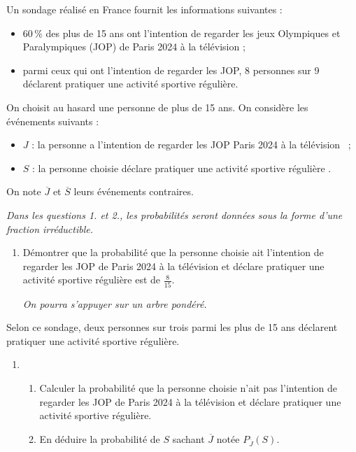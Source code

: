 Un sondage réalisé en France fournit les informations suivantes :

\begin{itemize}
	\item 60\,\% des plus de 15 ans ont l'intention de regarder les jeux Olympiques et Paralympiques (JOP) de Paris 2024 à la télévision ;
	\item parmi ceux qui ont l'intention de regarder les JOP, 8 personnes sur 9 déclarent pratiquer une activité sportive régulière.
\end{itemize}

On choisit au hasard une personne de plus de 15 ans. On considère les événements suivants :

\begin{itemize}
	\item $J$ : \og la personne a l'intention de regarder les JOP Paris 2024 à la télévision \fg\ ;
	\item $S$ : \og la personne choisie déclare pratiquer une activité sportive régulière \fg.
\end{itemize}

On note $\overline{J}$ et $\overline{S}$ leurs événements contraires.

\smallskip

\textit{Dans les questions 1. et 2., les probabilités seront données sous la forme d'une fraction irréductible.}

\begin{enumerate}
	\item Démontrer que la probabilité que la personne choisie ait l'intention de regarder les JOP de Paris 2024 à la télévision et déclare pratiquer une activité sportive régulière est de $\frac{8}{15}$.
	
	\textit{On pourra s'appuyer sur un arbre pondéré.}
\end{enumerate}

Selon ce sondage, deux personnes sur trois parmi les plus de 15 ans déclarent pratiquer une activité sportive régulière.

\begin{enumerate}[resume]
	\item 
	\begin{enumerate}
		\item Calculer la probabilité que la personne choisie n'ait pas l'intention de regarder les JOP de Paris 2024 à la télévision et déclare pratiquer une activité sportive régulière.
		\item En déduire la probabilité de $S$ sachant $\overline{J}$ notée $P_{\overline{J}}(S)$.
	\end{enumerate}
\end{enumerate}

